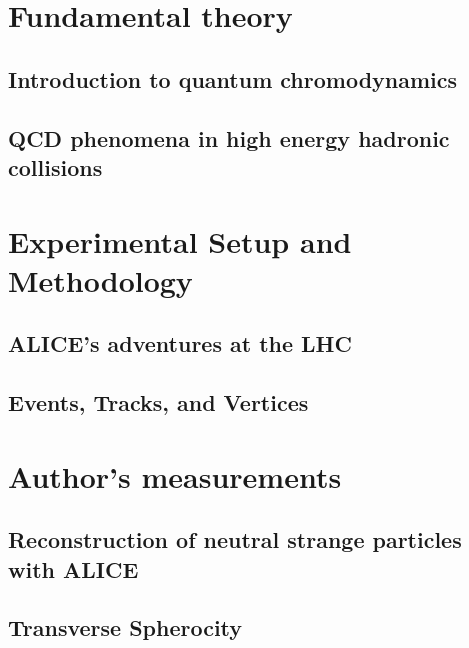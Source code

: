 \documentclass[11pt]{book}
\begin{document}
\mainmatter
\setcounter{table}{0} 
\setcounter{page}{1}

\chap{\myTitle}
\newpage

\part{Fundamental theory}
\chapter{Introduction to quantum chromodynamics}

\chapter{QCD phenomena in high energy hadronic collisions}


\part{Experimental Setup and Methodology}
\chapter{ALICE's adventures at the LHC}
%
\chapter{Events, Tracks, and Vertices}
%

\part{Author's measurements}
\chapter{Reconstruction of neutral strange particles with ALICE}

\chapter{Transverse Spherocity}
%
\end{document}

